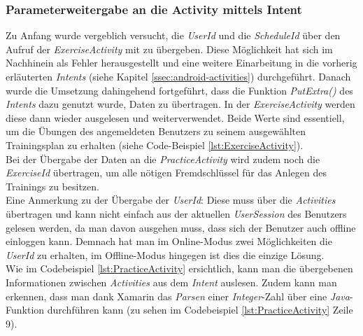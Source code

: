 \subsubsection*{Parameterweitergabe an die Activity mittels Intent}
Zu Anfang wurde vergeblich versucht, die \textit{UserId} und die \textit{ScheduleId} über den Aufruf der \textit{ExerciseActivity} mit zu übergeben. Diese Möglichkeit hat sich im Nachhinein als Fehler herausgestellt und eine weitere Einarbeitung in die vorherig erläuterten \textit{Intents} (siehe Kapitel \ref{ssec:android-activities}) durchgeführt. Danach wurde die Umsetzung dahingehend fortgeführt, dass die Funktion \textit{PutExtra()} des \textit{Intents} dazu genutzt wurde, Daten zu übertragen. In der \textit{ExerciseActivity} werden diese dann wieder ausgelesen und weiterverwendet. Beide Werte sind essentiell, um die Übungen des angemeldeten Benutzers zu seinem ausgewählten Trainingsplan zu erhalten (siehe Code-Beispiel \ref{lst:ExerciseActivity}).\\

Bei der Übergabe der Daten an die \textit{PracticeActivity} wird zudem noch die \textit{ExerciseId} übertragen, um alle nötigen Fremdschlüssel für das Anlegen des Trainings zu besitzen.\\
Eine Anmerkung zu der Übergabe der \textit{UserId}: Diese muss über die \textit{Activities} übertragen und kann nicht einfach aus der aktuellen \textit{UserSession} des Benutzers gelesen werden, da man davon ausgehen muss, dass sich der Benutzer auch offline einloggen kann. Demnach hat man im Online-Modus zwei Möglichkeiten die \textit{UserId} zu erhalten, im Offline-Modus hingegen ist dies die einzige Lösung.\\

Wie im Codebeispiel \ref{lst:PracticeActivity} ersichtlich, kann man die übergebenen Informationen zwischen \textit{Activities} aus dem \textit{Intent} auslesen. Zudem kann man erkennen, dass man dank Xamarin das \textit{Parsen} einer \textit{Integer}-Zahl über eine \textit{Java}-Funktion durchführen kann (zu sehen im Codebeispiel \ref{lst:PracticeActivity} Zeile 9).\\
